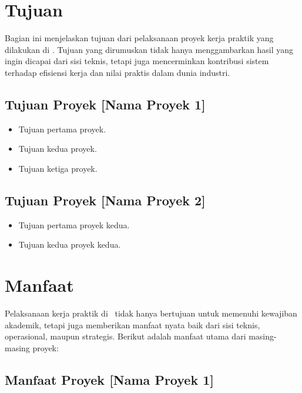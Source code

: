 \section{Tujuan}

Bagian ini menjelaskan tujuan dari pelaksanaan proyek kerja praktik yang
dilakukan di \NamaPerusahaan. Tujuan yang dirumuskan tidak hanya menggambarkan
hasil yang ingin dicapai dari sisi teknis, tetapi juga mencerminkan kontribusi
sistem terhadap efisiensi kerja dan nilai praktis dalam dunia industri.

\subsection{Tujuan Proyek [Nama Proyek 1]}

\begin{itemize}[leftmargin=*, itemsep=0pt]
  \item Tujuan pertama proyek.
  \item Tujuan kedua proyek.
  \item Tujuan ketiga proyek.
\end{itemize}

\subsection{Tujuan Proyek [Nama Proyek 2]}

\begin{itemize}[leftmargin=*, itemsep=0pt]
  \item Tujuan pertama proyek kedua.
  \item Tujuan kedua proyek kedua.
\end{itemize}

\section{Manfaat}

Pelaksanaan kerja praktik di \NamaPerusahaan\ tidak hanya bertujuan untuk
memenuhi kewajiban akademik, tetapi juga memberikan manfaat nyata baik dari
sisi teknis, operasional, maupun strategis. Berikut adalah manfaat utama dari
masing-masing proyek:

\subsection{Manfaat Proyek [Nama Proyek 1]}

